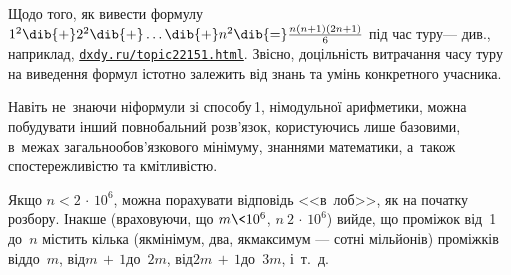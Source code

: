Щодо того, як вивести формулу $1^2\dib{{+}}2^2\dib{{+}}\dots\dib{{+}}n^2\dib{{=}}\frac{n(n+1)(2n+1)}{6}$ під час туру\nolinebreak[3] --- див., наприклад, \href{https://dxdy.ru/topic22151.html}{\texttt{\mbox{dxdy.ru/}\nolinebreak[2]\mbox{topic22151.html}}}. Звісно, доцільність витрачання часу туру на виведення формул істотно залежить від знань та умінь конкретного учасника.


Навіть не~знаючи ні\nolinebreak[2] формули зі способу\nolinebreak[3] \textnumero$\,$1, ні\nolinebreak[2] модульної арифметики, можна побудувати інший повнобальний розв'язок, користуючись лише базовими, в~межах загальнообов'язкового мінімуму, знаннями математики, а~також спостережливістю та кмітливістю.

Якщо $n < 2\,{\cdot}\,10^6$, можна порахувати відповідь <<в~лоб>>, як на початку розбору.
Інакше (враховуючи, що ${m\<10^6}$, $n \> 2\,{\cdot}\,10^6$) вийде, що проміжок від~1 до~$n$ містить кілька (як\nolinebreak[3] мінімум, два, як\nolinebreak[3] максимум ---  сотні мільйонів) проміжків від\nolinebreak[2] до~$m$, від\nolinebreak[2] ${m\,{+}\,1}$\nolinebreak[2] до~$2m$, від\nolinebreak[2] ${2m\,{+}\,1}$\nolinebreak[2] до~$3m$, і~т.~д.


